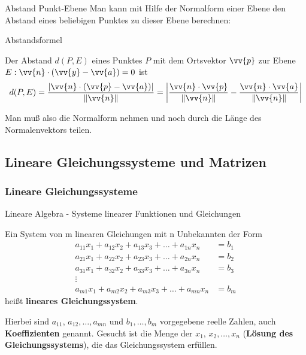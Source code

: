 \begin{frame}{Abstand Punkt-Ebene}
	Man kann mit Hilfe der Normalform einer Ebene den Abstand eines beliebigen Punktes zu dieser Ebene berechnen:
	\begin{framed}
	\begin{center}
		Abstandsformel
	\end{center}
	Der Abstand $d(P,E)$ eines Punktes $P$ mit dem Ortsvektor $\vv{p}$ zur Ebene $E : \vv{n} \cdot \left( \vv{y}  - \vv{a} \right) = 0$ ist
	\[
	d(P,E) = \frac{\left| \vv{n} \cdot \left( \vv{p} - \vv{a} \right) \right|}{\| \vv{n} \|} = \left| \frac{\vv{n} \cdot \vv{p}}{\| \vv{n} \|} - \frac{\vv{n} \cdot \vv{a}}{\| \vv{n} \|} \right|
	\]
	\end{framed}
	Man muß  also die Normalform nehmen und noch durch die Länge des Normalenvektors teilen.
\end{frame}

\subsection{Lineare Gleichungssysteme und Matrizen}
\subsubsection{Lineare Gleichungssysteme}

\begin{frame}{Lineare Algebra - Systeme linearer Funktionen und Gleichungen}

\begin{definition}
	
	Ein System von m linearen Gleichungen mit n Unbekannten der Form
\begin{align*}
a_{11} x_{1} + a_{12} x_{2} + a_{13} x_{3} + \ldots + a_{1n} x_{n}  & =   b_{1} \\
a_{21} x_{1} + a_{22} x_{2} + a_{23} x_{3} + \ldots + a_{2n} x_{n}  & =   b_{2} \\
a_{31} x_{1} + a_{32} x_{2} + a_{33} x_{3} + \ldots + a_{3n} x_{n}  & =   b_{3} \\
\vdots \qquad &  \\
a_{m1} x_{1} + a_{m2} x_{2} + a_{m3} x_{3} + \ldots + a_{mn} x_{n}  & =   b_{m}
\end{align*}
heißt \textbf{lineares Gleichungssystem}.
\end{definition}
\begin{bemerkung}
	Hierbei sind $a_{11}$, $a_{12}, \ldots , a_{mn}$ und $b_1 , \ldots , b_m$ vorgegebene reelle Zahlen, auch \textbf{Koeffizienten} genannt. Gesucht ist die Menge der $x_1$, $x_2, \ldots , x_n$ (\textbf{Lösung des Gleichungssystems}), die das Gleichungssystem erfüllen.
\end{bemerkung}
\end{frame}

